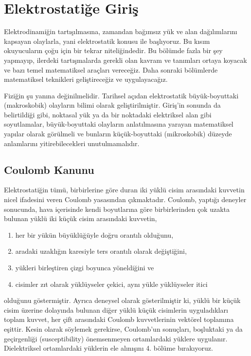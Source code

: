 \cleardoublepage

\chapter{Elektrostatiğe Giriş}

Elektrodinamiğin tartışılmasına, zamandan bağımsız yük ve alan dağılımlarını kapsayan olaylarla, yani elektrostatik konusu ile başlıyoruz. Bu kısım okuyucuların çoğu için bir tekrar niteliğindedir. Bu bölümde fazla bir şey yapmayıp, ilerdeki tartışmalarda gerekli olan kavram ve tanımları ortaya koyacak ve bazı temel matematiksel araçları vereceğiz. Daha sonraki bölümlerde matematiksel teknikleri geliştireceğiz ve uygulayacağız.

Fiziğin şu yanına değinilmelidir. Tarihsel açıdan elektrostatik büyük-boyuttaki (makroskobik) olayların bilimi olarak geliştirilmiştir. Giriş'in sonunda da belirtildiği gibi, noktasal yük ya da bir noktadaki elektriksel alan gibi soyutlamalar, büyük-boyuttaki olayların anlatılmasına yarayan matematiksel yapılar olarak görülmeli ve bunların küçük-boyuttaki (mikroskobik) düzeyde anlamlarını yitirebilecekleri unutulmamalıdır.


\section{Coulomb Kanunu}

Elektrostatiğin tümü, birbirlerine göre duran iki yüklü cisim arasındaki kuvvetin nicel ifadesini veren Coulomb yasasından çıkmaktadır. Coulomb, yaptığı deneyler sonucunda, hava içerisinde kendi boyutlarına göre birbirlerinden çok uzakta bulunan yüklü iki küçük cisim arasındaki kuvvetin,

\begin{enumerate}
  \item her bir yükün büyüklüğüyle doğru orantılı olduğunu,
  \item aradaki uzaklığın karesiyle ters orantılı olarak değiştiğini, 
  \item yükleri birleştiren çizgi boyunca yöneldiğini ve
  \item cisimler zıt olarak yüklüyseler çekici, aynı yükle yüklüyseler itici

\end{enumerate}

olduğunu göstermiştir. Ayrıca deneysel olarak gösterilmiştir ki, yüklü bir küçük cisim üzerine dolayında bulunan diğer yüklü küçük cisimlerin uyguladıkları toplam kuvvet, her çift arasındaki Coulomb kuvvetlerinin vektörel toplamına eşittir. Kesin olarak söylemek gerekirse, Coulomb'un sonuçları, boşluktaki ya da geçirgenliği (susceptibility) önemsenmeyen ortamlardaki yüklere uygulanır. Dielektriksel ortamlardaki yüklerin ele alınışını 4. bölüme bırakıyoruz.



